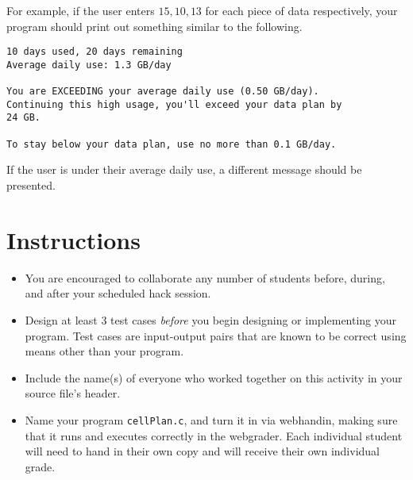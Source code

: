 \documentclass[12pt]{scrartcl}
\begin{document}
For example, if the user enters $15, 10, 13$ for each piece of data
respectively, your program should print out something similar to 
the following.

\begin{verbatim}
10 days used, 20 days remaining
Average daily use: 1.3 GB/day

You are EXCEEDING your average daily use (0.50 GB/day).
Continuing this high usage, you'll exceed your data plan by
24 GB.

To stay below your data plan, use no more than 0.1 GB/day.
\end{verbatim}

If the user is under their average daily use, a different
message should be presented.  

\section*{Instructions}

\begin{itemize}
  \item You are encouraged to collaborate any number of students 
  before, during, and after your scheduled hack session.  
  \item Design at least 3 test cases \emph{before} you begin
  designing or implementing your program.  Test cases are 
  input-output pairs that are known to be correct using means
  other than your program.
  \item Include the name(s) of everyone who worked together on
  this activity in your source file's header.
  \item Name your program \texttt{cellPlan.c}, and
  turn it in via webhandin, making sure that it runs and executes
  correctly in the webgrader.  Each individual student will need
  to hand in their own copy and will receive their own individual
  grade.
\end{itemize}
  
\end{document}

